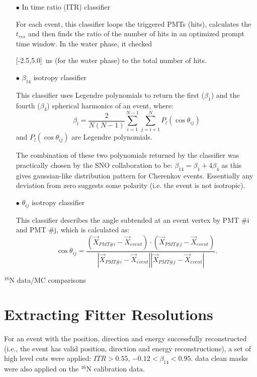 \begin{itemize}
	\item[$\bullet$] In time ratio (ITR) classifier
	
	For each event, this classifier loops the triggered PMTs (hits), calculates the $t_{res}$ and then finds the ratio of the number of hits in an optimized prompt time window. In the water phase, it checked 
	
	[-2.5,5.0]~ns (for the water phase) to the total number of hits.
	
	
	\item[$\bullet$] $\beta_{14}$ isotropy classifier
	
	This classifier uses Legendre polynomials to return the	first ($\beta_1$) and the fourth ($\beta_4$) spherical	harmonics of an event, where:
	\[
	\beta_l = \frac{2}{N(N-1)}\sum_{i=1}^{N-1}\sum_{j=i+1}^N P_l(\cos\theta_{ij})
	\]
	and $P_l(\cos\theta_{ij})$ are Legendre polynomials.
	
	
	The	combination	of these two polynomials returned by the classifier	was	
	practically	chosen by the SNO collaboration	to be: $\beta_{14}=\beta_1+4\beta_4$
	as this gives gaussian-like	distribution pattern for Cherenkov events.	
	Essentially	any	deviation from zero suggests some polarity (i.e. the event is not isotropic).	
	
	
	\item[$\bullet$] $\theta_{ij}$ isotropy classifier 
	
	This classifier describes the angle subtended at an event vertex by PMT \#i and PMT \#j, which is calculated as:
	\begin{equation}
	\cos\theta_{ij}=\frac{(\vec{X}_{PMT\#i}- \vec{X}_{event})\cdot (\vec{X}_{PMT\#j}- \vec{X}_{event})}{|\vec{X}_{PMT\#i}- \vec{X}_{event}||\vec{X}_{PMT\#j}- \vec{X}_{event}|}.
	\end{equation}
\end{itemize}

$^{16}$N data/MC comparisons




\section{Extracting Fitter Resolutions}
For an event with the position, direction and energy successfully reconstructed (i.e., the event has valid position, direction and energy reconstructions), a set of high level cuts were applied: $ITR>0.55$, $-0.12<\beta_{14}<0.95$. 
data clean masks were also applied on the $^{16}$N calibration data.

